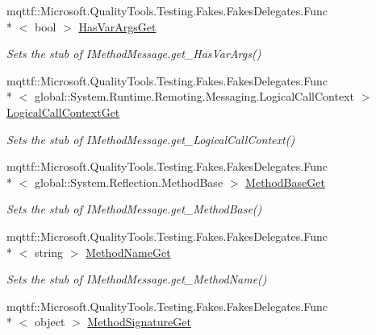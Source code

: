 \begin{DoxyCompactItemize}
mqttf\-::\-Microsoft.\-Quality\-Tools.\-Testing.\-Fakes.\-Fakes\-Delegates.\-Func\\*
$<$ bool $>$ \hyperlink{class_system_1_1_runtime_1_1_remoting_1_1_messaging_1_1_fakes_1_1_stub_i_method_message_a92fa9c6dfaabd1ac1efa3a57a1bc125f}{Has\-Var\-Args\-Get}
\begin{DoxyCompactList}\small\item\em Sets the stub of I\-Method\-Message.\-get\-\_\-\-Has\-Var\-Args()\end{DoxyCompactList}\item 
mqttf\-::\-Microsoft.\-Quality\-Tools.\-Testing.\-Fakes.\-Fakes\-Delegates.\-Func\\*
$<$ global\-::\-System.\-Runtime.\-Remoting.\-Messaging.\-Logical\-Call\-Context $>$ \hyperlink{class_system_1_1_runtime_1_1_remoting_1_1_messaging_1_1_fakes_1_1_stub_i_method_message_a2084178800afbda502f363104bc7cd11}{Logical\-Call\-Context\-Get}
\begin{DoxyCompactList}\small\item\em Sets the stub of I\-Method\-Message.\-get\-\_\-\-Logical\-Call\-Context()\end{DoxyCompactList}\item 
mqttf\-::\-Microsoft.\-Quality\-Tools.\-Testing.\-Fakes.\-Fakes\-Delegates.\-Func\\*
$<$ global\-::\-System.\-Reflection.\-Method\-Base $>$ \hyperlink{class_system_1_1_runtime_1_1_remoting_1_1_messaging_1_1_fakes_1_1_stub_i_method_message_abe6fccbb738a2d4cf0c75c4fac70b42a}{Method\-Base\-Get}
\begin{DoxyCompactList}\small\item\em Sets the stub of I\-Method\-Message.\-get\-\_\-\-Method\-Base()\end{DoxyCompactList}\item 
mqttf\-::\-Microsoft.\-Quality\-Tools.\-Testing.\-Fakes.\-Fakes\-Delegates.\-Func\\*
$<$ string $>$ \hyperlink{class_system_1_1_runtime_1_1_remoting_1_1_messaging_1_1_fakes_1_1_stub_i_method_message_a4e92e372abd948f743a1d8872d903440}{Method\-Name\-Get}
\begin{DoxyCompactList}\small\item\em Sets the stub of I\-Method\-Message.\-get\-\_\-\-Method\-Name()\end{DoxyCompactList}\item 
mqttf\-::\-Microsoft.\-Quality\-Tools.\-Testing.\-Fakes.\-Fakes\-Delegates.\-Func\\*
$<$ object $>$ \hyperlink{class_system_1_1_runtime_1_1_remoting_1_1_messaging_1_1_fakes_1_1_stub_i_method_message_aee883b79b824a180389853e17671622e}{Method\-Signature\-Get}

\end{DoxyCompactItemize}
